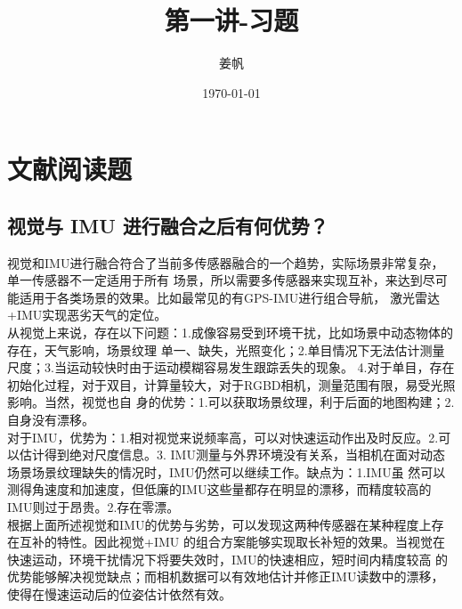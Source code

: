\documentclass[UTF8]{ctexart}
\title{第一讲-习题}
\author{姜帆}
\date{\today}
\begin{document}
\maketitle
\tableofcontents
\newpage
\section{文献阅读题}
\subsection{视觉与 IMU 进行融合之后有何优势？}
\indent 视觉和IMU进行融合符合了当前多传感器融合的一个趋势，实际场景非常复杂，单一传感器不一定适用于所有
场景，所以需要多传感器来实现互补，来达到尽可能适用于各类场景的效果。比如最常见的有GPS-IMU进行组合导航，
激光雷达+IMU实现恶劣天气的定位。\\
\indent 从视觉上来说，存在以下问题：1.成像容易受到环境干扰，比如场景中动态物体的存在，天气影响，场景纹理
单一、缺失，光照变化；2.单目情况下无法估计测量尺度；3.当运动较快时由于运动模糊容易发生跟踪丢失的现象。
4.对于单目，存在初始化过程，对于双目，计算量较大，对于RGBD相机，测量范围有限，易受光照影响。当然，视觉也自
身的优势：1.可以获取场景纹理，利于后面的地图构建；2.自身没有漂移。\\
\indent 对于IMU，优势为：1.相对视觉来说频率高，可以对快速运动作出及时反应。2.可以估计得到绝对尺度信息。3.
IMU测量与外界环境没有关系，当相机在面对动态场景场景纹理缺失的情况时，IMU仍然可以继续工作。缺点为：1.IMU虽
然可以测得角速度和加速度，但低廉的IMU这些量都存在明显的漂移，而精度较高的IMU则过于昂贵。2.存在零漂。\\
\indent 根据上面所述视觉和IMU的优势与劣势，可以发现这两种传感器在某种程度上存在互补的特性。因此视觉+IMU
的组合方案能够实现取长补短的效果。当视觉在快速运动，环境干扰情况下将要失效时，IMU的快速相应，短时间内精度较高
的优势能够解决视觉缺点；而相机数据可以有效地估计并修正IMU读数中的漂移，使得在慢速运动后的位姿估计依然有效。
\end{document}
